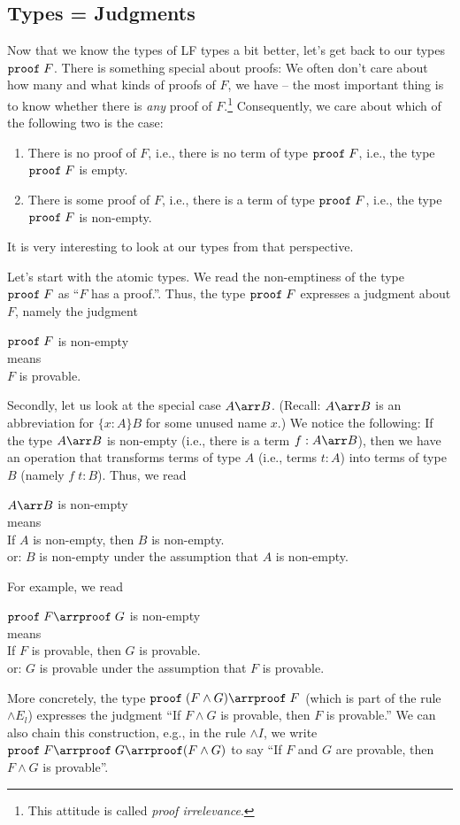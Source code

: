 \subsection{Types = Judgments}

Now that we know the types of LF types a bit better, let's get back to our types $\mathtt{proof}\;F$. There is something special about proofs: We often don't care about how many and what kinds of proofs of $F$, we have -- the most important thing is to know whether there is \emph{any} proof of $F$.\footnote{This attitude is called \emph{proof irrelevance}.} Consequently, we care about which of the following two is the case:
 \begin{enumerate}
   \item There is no proof of $F$, i.e., there is no term of type $\mathtt{proof}\;F$, i.e., the type $\mathtt{proof}\;F$ is empty.
   \item There is some proof of $F$, i.e., there is a term of type $\mathtt{proof}\;F$, i.e., the type $\mathtt{proof}\;F$ is non-empty.
 \end{enumerate}

It is very interesting to look at our types from that perspective.
\medskip

Let's start with the atomic types. We read the non-emptiness of the type $\mathtt{proof}\;F$ as ``$F$ has a proof.''. Thus, the type $\mathtt{proof}\;F$ expresses a judgment about $F$, namely the judgment
\begin{center}
$\mathtt{proof}\;F$ is non-empty\\ means \\ $F$ is provable.
\end{center}

Secondly, let us look at the special case $A\arr B$. (Recall: $A\arr B$ is an abbreviation for $\{x:A\}B$ for some unused name $x$.) We notice the following:
If the type $A\arr B$ is non-empty (i.e., there is a term $f:A\arr B$), then we have an operation that transforms terms of type $A$ (i.e., terms $t:A$) into terms of type $B$ (namely $f\;t:B$). Thus, we read 
\begin{center}
$A\arr B$ is non-empty\\ means \\ If $A$ is non-empty, then $B$ is non-empty. \\ or: $B$ is non-empty under the assumption that $A$ is non-empty.
\end{center}

For example, we read
\begin{center}
$\PROOF\;F\arr\PROOF\;G$ is non-empty\\ means \\ If $F$ is provable, then $G$ is provable. \\ or: $G$ is provable under the assumption that $F$ is provable.
\end{center}
More concretely, the type $\PROOF\;(F\wedge G)\arr\PROOF\;F$ (which is part of the rule $\wedge E_l$) expresses the judgment ``If $F\wedge G$ is provable, then $F$ is provable.'' We can also chain this construction, e.g., in the rule $\wedge I$, we write $\PROOF\;F\arr\PROOF\;G\arr\PROOF(F\wedge G)$ to say ``If $F$ and $G$ are provable, then $F\wedge G$ is provable''.

